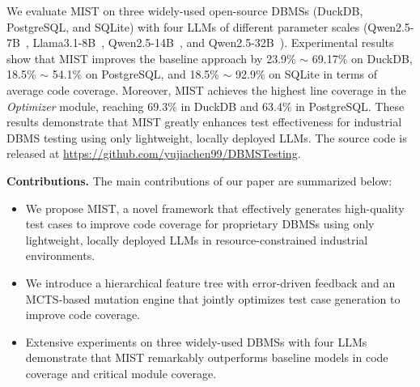 We evaluate MIST on three widely-used open-source DBMSs (DuckDB, PostgreSQL, and SQLite) with four LLMs of different parameter scales (Qwen2.5-7B~\cite{Qwen2.5}, Llama3.1-8B~\cite{llama3.1}, Qwen2.5-14B~\cite{Qwen2.5}, and Qwen2.5-32B~\cite{Qwen2.5}). Experimental results show that MIST improves the baseline approach by 23.9\% $\sim$ 69.17\% on DuckDB, 18.5\% $\sim$ 54.1\% on PostgreSQL, and 18.5\% $\sim$ 92.9\% on SQLite in terms of average code coverage. Moreover, MIST achieves the highest line coverage in the \textit{Optimizer} module, reaching 69.3\% in DuckDB and 63.4\% in PostgreSQL. These results demonstrate that MIST greatly enhances test effectiveness for industrial DBMS testing using only lightweight, locally deployed LLMs. The source code is released at \url{https://github.com/yujiachen99/DBMSTesting}.

\noindent\textbf{Contributions.} The main contributions of our paper are summarized below:

\begin{itemize}[leftmargin=*]
    \item We propose MIST, a novel framework that effectively generates high-quality test cases to improve code coverage for proprietary DBMSs using only lightweight, locally deployed LLMs in resource-constrained industrial environments.
    
    \item We introduce a hierarchical feature tree with error-driven feedback and an MCTS-based mutation engine that jointly optimizes test case generation to improve code coverage.
    
    \item Extensive experiments on three widely-used DBMSs with four LLMs demonstrate that MIST remarkably outperforms baseline models in code coverage and critical module coverage.
    \end{itemize}


